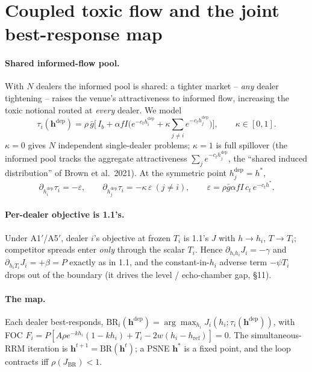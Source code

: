 \documentclass[11pt]{article}
\newcommand{\eps}{\varepsilon}
\newcommand{\gbar}{\bar g}
\newcommand{\hrefp}{h_{\mathrm{ref}}}
\newcommand{\BR}{\mathrm{BR}}
\newcommand{\bvh}{\bm{h}}
\begin{document}
\section{Coupled toxic flow and the joint best-response map}

\paragraph{Shared informed-flow pool.}
With $N$ dealers the informed pool is shared: a tighter market -- \emph{any} dealer
tightening -- raises the venue's attractiveness to informed flow, increasing the
toxic notional routed at \emph{every} dealer. We model
%
\begin{equation}
  \tau_i(\bvh^{\mathrm{dep}})
  = \rho\,\gbar\Big[\, I_b + \alpha f I\Big( e^{-c_t h_i^{\mathrm{dep}}}
     + \kappa\!\!\sum_{j\ne i} e^{-c_t h_j^{\mathrm{dep}}}\Big)\Big],
  \qquad \kappa\in[0,1].
  \label{eq:taui}
\end{equation}
%
$\kappa=0$ gives $N$ independent single-dealer problems; $\kappa=1$ is full
spillover (the informed pool tracks the aggregate attractiveness
$\sum_j e^{-c_t h_j^{\mathrm{dep}}}$, the ``shared induced distribution'' of Brown
et al.\ 2021). At the symmetric point $h_j^{\mathrm{dep}}=h^*$,
%
\begin{equation*}
  \partial_{h_i^{\mathrm{dep}}}\tau_i = -\eps,\qquad
  \partial_{h_j^{\mathrm{dep}}}\tau_i = -\kappa\,\eps \ (j\ne i),\qquad
  \eps=\rho\gbar\alpha f I\,c_t\,e^{-c_t h^*}.
\end{equation*}

\paragraph{Per-dealer objective is 1.1's.}
Under A1$'$/A5$'$, dealer $i$'s objective at frozen $T_i$ is 1.1's $J$ with
$h\!\to\!h_i$, $T\!\to\!T_i$; competitor spreads enter \emph{only} through the scalar
$T_i$. Hence $\partial_{h_ih_i}J_i=-\gamma$ and $\partial_{h_iT_i}J_i=+\beta=P$
exactly as in 1.1, and the constant-in-$h_i$ adverse term $-\psi T_i$ drops out of
the boundary (it drives the level / echo-chamber gap, \S11).

\paragraph{The map.}
Each dealer best-responds, $\BR_i(\bvh^{\mathrm{dep}})=\arg\max_{h_i}J_i(h_i;\tau_i(\bvh^{\mathrm{dep}}))$,
with FOC
$F_i=P[A\rho e^{-kh_i}(1-kh_i)+T_i-2w(h_i-\hrefp)]=0$.
The simultaneous-RRM iteration is $\bvh^{t+1}=\BR(\bvh^{t})$; a PSNE $\bvh^*$ is a
fixed point, and the loop contracts iff $\rho(J_{\BR})<1$.
\end{document}

